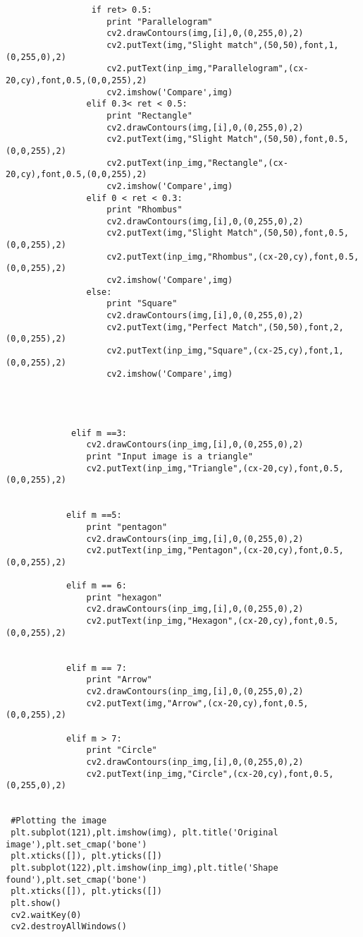 \documentclass[]{article}
\begin{document}
\begin{verbatim}
                 if ret> 0.5:
                    print "Parallelogram"
                    cv2.drawContours(img,[i],0,(0,255,0),2)
                    cv2.putText(img,"Slight match",(50,50),font,1,(0,255,0),2)
                    cv2.putText(inp_img,"Parallelogram",(cx-20,cy),font,0.5,(0,0,255),2)
                    cv2.imshow('Compare',img)
                elif 0.3< ret < 0.5:
                    print "Rectangle"
                    cv2.drawContours(img,[i],0,(0,255,0),2)
                    cv2.putText(img,"Slight Match",(50,50),font,0.5,(0,0,255),2)
                    cv2.putText(inp_img,"Rectangle",(cx-20,cy),font,0.5,(0,0,255),2)
                    cv2.imshow('Compare',img)
                elif 0 < ret < 0.3:
                    print "Rhombus"
                    cv2.drawContours(img,[i],0,(0,255,0),2)
                    cv2.putText(img,"Slight Match",(50,50),font,0.5,(0,0,255),2)
                    cv2.putText(inp_img,"Rhombus",(cx-20,cy),font,0.5,(0,0,255),2)
                    cv2.imshow('Compare',img)
                else:
                    print "Square"
                    cv2.drawContours(img,[i],0,(0,255,0),2)
                    cv2.putText(img,"Perfect Match",(50,50),font,2,(0,0,255),2)
                    cv2.putText(inp_img,"Square",(cx-25,cy),font,1,(0,0,255),2)
                    cv2.imshow('Compare',img)
                
                
        
        
             elif m ==3:
                cv2.drawContours(inp_img,[i],0,(0,255,0),2)
                print "Input image is a triangle"
                cv2.putText(inp_img,"Triangle",(cx-20,cy),font,0.5,(0,0,255),2)
        
                        
            elif m ==5:
                print "pentagon"
                cv2.drawContours(inp_img,[i],0,(0,255,0),2)
                cv2.putText(inp_img,"Pentagon",(cx-20,cy),font,0.5,(0,0,255),2)
            
            elif m == 6:
                print "hexagon"
                cv2.drawContours(inp_img,[i],0,(0,255,0),2)
                cv2.putText(inp_img,"Hexagon",(cx-20,cy),font,0.5,(0,0,255),2)
        
        
            elif m == 7:
                print "Arrow"
                cv2.drawContours(inp_img,[i],0,(0,255,0),2)
                cv2.putText(img,"Arrow",(cx-20,cy),font,0.5,(0,0,255),2)
        
            elif m > 7:
                print "Circle"
                cv2.drawContours(inp_img,[i],0,(0,255,0),2)
                cv2.putText(inp_img,"Circle",(cx-20,cy),font,0.5,(0,255,0),2)
       

 #Plotting the image
 plt.subplot(121),plt.imshow(img), plt.title('Original image'),plt.set_cmap('bone')
 plt.xticks([]), plt.yticks([])
 plt.subplot(122),plt.imshow(inp_img),plt.title('Shape found'),plt.set_cmap('bone')
 plt.xticks([]), plt.yticks([])
 plt.show()
 cv2.waitKey(0)
 cv2.destroyAllWindows()
\end{verbatim}
\end{document}
